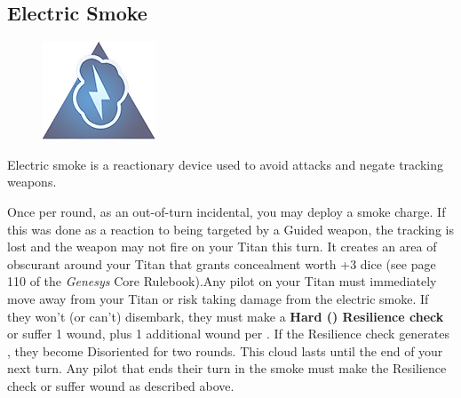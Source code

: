 \documentclass[9pt, openany]{extbook}
\begin{document}
\subsection{Electric Smoke}
\begin{figure}
\vspace*{-2em}
\includegraphics[width=\linewidth]{ElectricSmoke}
\end{figure}

Electric smoke is a reactionary device used to avoid attacks and negate tracking weapons.

Once per round, as an out-of-turn incidental, you may deploy a smoke charge. If this was done as a reaction to being targeted by a Guided weapon, the tracking is lost and the weapon may not fire on your Titan this turn. It creates an area of obscurant around your Titan that grants concealment worth +3 dice (see page 110 of the \emph{Genesys} Core Rulebook).Any pilot on your Titan must immediately move away from your Titan or risk taking damage from the electric smoke. If they won't (or can't) disembark, they must make a \textbf{Hard (\DifficultyDie\DifficultyDie\DifficultyDie) Resilience check} or suffer 1 wound, plus 1 additional wound per \Failure. If the Resilience check generates \Threat\Threat, they become Disoriented for two rounds. This cloud lasts until the end of your next turn. Any pilot that ends their turn in the smoke must make the Resilience check or suffer wound as described above.
\end{document}
